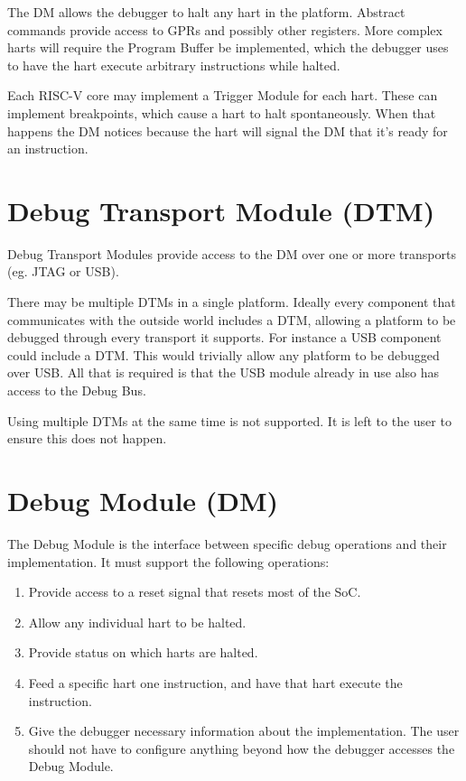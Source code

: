 \documentclass{article}
\newenvironment{steps}[1]
{
   \vspace{1ex}
   \noindent
   #1
   \begin{enumerate}[nosep]
}
{
   \end{enumerate}
   \vspace{1ex}
}
\begin{document}
The DM allows the debugger to halt any hart in the platform. Abstract commands
provide access to GPRs and possibly other registers. More complex harts will
require the Program Buffer be implemented, which the debugger uses to have the
hart execute arbitrary instructions while halted.

Each RISC-V core may implement a Trigger Module for each hart.  These can
implement breakpoints, which cause a hart to halt spontaneously.  When that
happens the DM notices because the hart will signal the DM that it's ready for
an instruction.

\section{Debug Transport Module (DTM)}

Debug Transport Modules provide access to the DM over one or more transports
(eg. JTAG or USB).

There may be multiple DTMs in a single platform. Ideally every component that
communicates with the outside world includes a DTM, allowing a platform to be
debugged through every transport it supports.  For instance a USB component
could include a DTM. This would trivially allow any platform to be debugged
over USB. All that is required is that the USB module already in use also has
access to the Debug Bus.

Using multiple DTMs at the same time is not supported. It is left to the user
to ensure this does not happen.

\section{Debug Module (DM)} \label{dm}

\begin{steps}{The Debug Module is the interface between specific debug
    operations and their implementation. It must support the following
    operations:}
\item Provide access to a reset signal that resets most of the SoC.
\item Allow any individual hart to be halted.
\item Provide status on which harts are halted.
\item Feed a specific hart one instruction, and have that hart execute the
    instruction.
\item Give the debugger necessary information about the implementation. The user
    should not have to configure anything beyond how the debugger accesses the
    Debug Module.
\end{steps}
\end{document}
